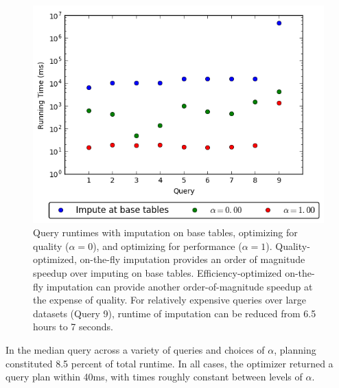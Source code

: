 \begin{figure}
\includegraphics[width=\columnwidth]{figures/running_times_combined.png}
\caption{Query runtimes with imputation on base tables, \ProjectName{}
    optimizing for quality ($\alpha=0$), and \ProjectName{} optimizing for
    performance ($\alpha=1$). Quality-optimized, on-the-fly imputation provides an order of
    magnitude speedup over imputing on base tables. Efficiency-optimized on-the-fly
    imputation can provide another order-of-magnitude speedup at the expense of quality. For
    relatively expensive queries over large datasets (Query 9), runtime of imputation can be reduced from 6.5
    hours to 7 seconds. }
\label{fig:runtimes}
\end{figure}


In the median query across a variety of queries and choices of $\alpha$, planning
constituted 8.5 percent of total runtime. In all cases, the optimizer
returned a query plan within 40ms, with times roughly constant between levels of $\alpha$.



